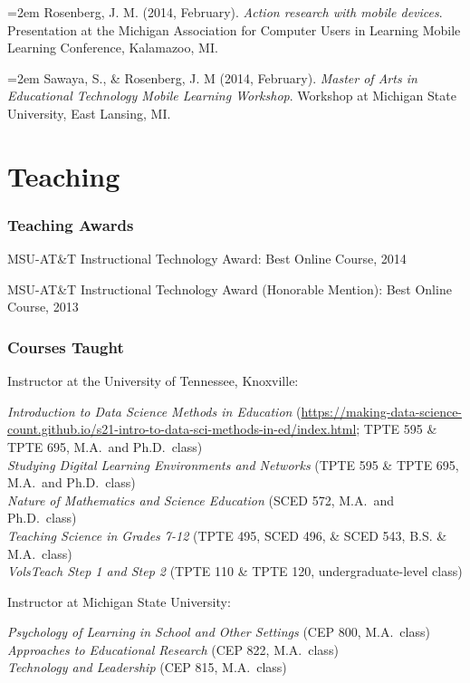 \documentclass[
  14,
]{article}
\begin{document}
\hangindent=2em Rosenberg, J. M. (2014, February). \emph{Action research
with mobile devices}. Presentation at the Michigan Association for
Computer Users in Learning Mobile Learning Conference, Kalamazoo, MI.

\hangindent=2em Sawaya, S., \& Rosenberg, J. M (2014, February).
\emph{Master of Arts in Educational Technology Mobile Learning
Workshop}. Workshop at Michigan State University, East Lansing, MI.

\hypertarget{teaching}{%
\section{Teaching}\label{teaching}}

\hypertarget{teaching-awards}{%
\subsubsection{Teaching Awards}\label{teaching-awards}}

MSU-AT\&T Instructional Technology Award: Best Online Course, 2014

MSU-AT\&T Instructional Technology Award (Honorable Mention): Best
Online Course, 2013

\hypertarget{courses-taught}{%
\subsubsection{Courses Taught}\label{courses-taught}}

Instructor at the University of Tennessee, Knoxville:

\emph{Introduction to Data Science Methods in Education}
(\url{https://making-data-science-count.github.io/s21-intro-to-data-sci-methods-in-ed/index.html};
TPTE 595 \& TPTE 695, M.A.~and Ph.D.~class)\\
\emph{Studying Digital Learning Environments and Networks} (TPTE 595 \&
TPTE 695, M.A.~and Ph.D.~class)\\
\emph{Nature of Mathematics and Science Education} (SCED 572, M.A.~and
Ph.D.~class)\\
\emph{Teaching Science in Grades 7-12} (TPTE 495, SCED 496, \& SCED 543,
B.S. \& M.A.~class)\\
\emph{VolsTeach Step 1 and Step 2} (TPTE 110 \& TPTE 120,
undergraduate-level class)

Instructor at Michigan State University:

\emph{Psychology of Learning in School and Other Settings} (CEP 800,
M.A.~class)\\
\emph{Approaches to Educational Research} (CEP 822, M.A.~class)\\
\emph{Technology and Leadership} (CEP 815, M.A.~class)
\end{document}
